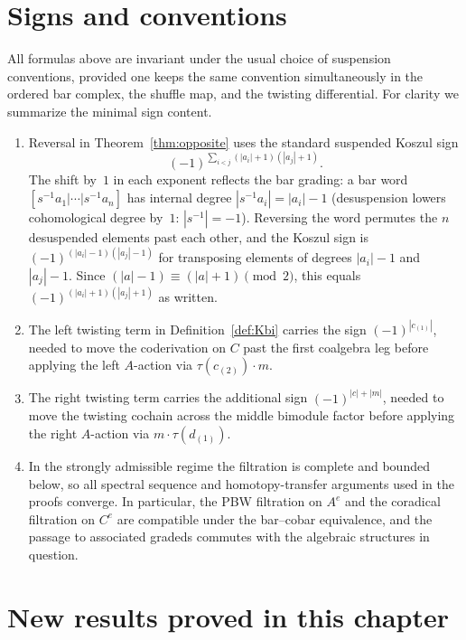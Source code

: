 \section{Signs and conventions}

All formulas above are invariant under the usual choice of suspension conventions, provided one keeps
the same convention simultaneously in the ordered bar complex, the shuffle map, and the twisting
differential. For clarity we summarize the minimal sign content.

\begin{enumerate}[label=(\arabic*)]
\item Reversal in Theorem~\ref{thm:opposite} uses the standard suspended Koszul sign
\[
(-1)^{\sum_{i<j}(|a_i|+1)(|a_j|+1)}.
\]
The shift by~$1$ in each exponent reflects the bar grading: a bar word $[s^{-1}a_1|\cdots|s^{-1}a_n]$ has internal degree $|s^{-1}a_i| = |a_i| - 1$ (desuspension lowers cohomological degree by~$1$: $|s^{-1}| = -1$). Reversing the word permutes the $n$ desuspended elements past each other, and the Koszul sign is $(-1)^{(|a_i|-1)(|a_j|-1)}$ for transposing elements of degrees $|a_i|-1$ and $|a_j|-1$. Since $(|a|-1)\equiv(|a|+1)\pmod{2}$, this equals $(-1)^{(|a_i|+1)(|a_j|+1)}$ as written.

\item The left twisting term in Definition~\ref{def:Kbi} carries the sign $(-1)^{|c_{(1)}|}$, needed to move the
coderivation on $C$ past the first coalgebra leg before applying the left $A$-action via $\tau(c_{(2)})\cdot m$.

\item The right twisting term carries the additional sign $(-1)^{|c|+|m|}$, needed to move the twisting cochain across
the middle bimodule factor before applying the right $A$-action via $m\cdot\tau(d_{(1)})$.

\item In the strongly admissible regime the filtration is complete and bounded below, so all spectral
sequence and homotopy-transfer arguments used in the proofs converge. In particular, the PBW filtration on $A^e$ and the coradical filtration on $C^e$ are compatible under the bar--cobar equivalence, and the passage to associated gradeds commutes with the algebraic structures in question.
\end{enumerate}

\section{New results proved in this chapter}

